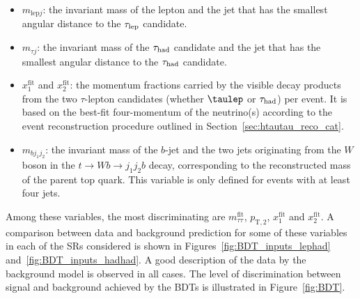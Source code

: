 \begin{itemize}
\item $m_{\text{lep}j}$: the invariant mass of the lepton and the jet that has the smallest angular distance to the $\tau_{\mathrm{lep}}$ candidate.
\item $m_{\tau j}$: the invariant mass of the  $\tau_{\mathrm{had}}$ candidate and the jet that has the smallest angular distance to the $\tau_{\mathrm{had}}$ candidate.
\item $x_{1}^{\text{fit}}$ and $x_{2}^{\text{fit}}$: the momentum fractions carried by the visible decay products from the two $\tau$-lepton candidates 
(whether $\taulep$ or $\tau_{\mathrm{had}}$) per event. It is based on the best-fit four-momentum of the neutrino(s) according to the event reconstruction procedure outlined in Section~\ref{sec:htautau_reco_cat}.
\item $m_{bj_1j_2}$: the invariant mass of the $b$-jet and the two jets originating from the $W$ boson in the $t\to Wb \to j_1j_2b$ decay, corresponding to the reconstructed mass of the parent top quark. This variable is only defined for events with at least four jets.
\end{itemize}

Among these variables, the most discriminating are $m_{\tau\tau}^{\text{fit}}$, $p_{\text{T},2}$, $x_{1}^{\text{fit}}$ and $x_{2}^{\text{fit}}$. A comparison between data and background prediction for some of these variables in each of the SRs considered is shown in Figures~\ref{fig:BDT_inputs_lephad} and~\ref{fig:BDT_inputs_hadhad}.
A good description of the data by the background model is observed in all cases.
The level of discrimination between signal and background achieved by the BDTs is illustrated in Figure~\ref{fig:BDT}.

